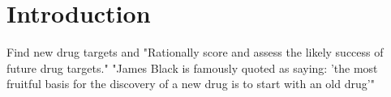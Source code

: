 % 


\section{Introduction}
Find new drug targets and "Rationally score and assess the likely success of future drug targets."
"James Black is famously quoted as saying: 'the most fruitful basis for the discovery of a new drug is to start with an old drug'"

